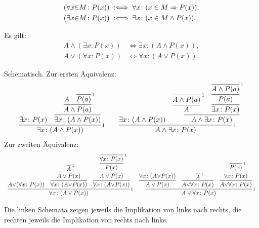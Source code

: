 \begin{Definition}%
\label{def:bounded}
\begin{align}
(\forall x{\in}M\colon P(x)) &\;:\Longleftrightarrow\; \forall x\colon (x\in M\Rightarrow P(x)),\\
(\exists x{\in}M\colon P(x)) &\;:\Longleftrightarrow\; \exists x\colon (x\in M\land P(x)).
\end{align}
\end{Definition}

\begin{Satz}%
\label{general-dl}
Es gilt:
\begin{align}
A\land (\exists x\colon P(x)) &\iff \exists x\colon (A\land P(x)),\\
A\lor (\forall x\colon P(x)) &\iff \forall x\colon (A\lor P(x)).
\end{align}
\end{Satz}
\begin{Beweis}
Schematisch. Zur ersten Äquivalenz:
\[\begin{array}{c@{\qquad}c}
\infer[\infernote{1}]{\exists x\colon (A\land P(x))}{
  \exists x\colon P(x)
  & \infer{\exists x\colon (A\land P(x))}{
      \infer{A\land P(a)}{A & \infer[\infernote{1}]{P(a)}{}}}
}
&
\infer[\infernote{1}]{A\land\exists x\colon P(x)}{
\exists x\colon (A\land P(x))
& \infer{A\land \exists x\colon P(x)}{
    \infer{A}{\infer[\infernote{1}]{A\land P(a)}{}}
  & \infer{\exists x\colon P(x)}{
      \infer{P(a)}{\infer[\infernote{1}]{A\land P(a)}{}}}
}
}
\end{array}\]
Zur zweiten Äquivalenz:
{\small
\[\begin{array}{c@{\quad}c}
\infer[\infernote{1}]{\forall x\colon (A\lor P(x))}{
A{\lor}(\forall x\colon P(x))
& \infer{\forall x\colon (A{\lor}P(x))}{
    \infer{A\lor P(x)}{\infer[\infernote{1}]{A}{}}
  }
& \infer{\forall x\colon (A{\lor}P(x))}{
    \infer{A\lor P(x)}{
      \infer{P(x)}{\infer[\infernote{1}]{\forall x\colon P(x)}{}}
    }
  }
}
&
\infer[\infernote{1}]{A\lor\forall x\colon P(x)}{
  \infer{A\lor P(x)}{\forall x\colon (A{\lor}P(x))}
  & \infer{A{\lor}\forall x\colon P(x)}{
      \infer[\infernote{1}]{A}{}}
  & \infer{A{\lor}\forall x\colon P(x)}{
      \infer{\forall x\colon P(x)}{
        \infer[\infernote{1}]{P(x)}{}}}
}
\end{array}\]
}

\noindent
Die linken Schemata zeigen jeweils die Implikation von links nach
rechts, die rechten jeweils die Implikation von rechts nach
links.\,\qedsymbol
\end{Beweis}

